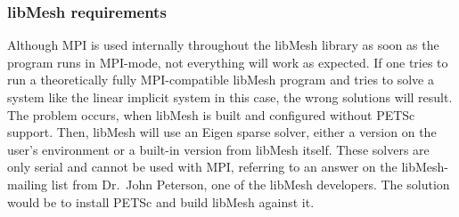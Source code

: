  
  \subsubsection{libMesh requirements}
   Although MPI is used internally throughout the libMesh library as soon as the program runs in MPI-mode, not everything will work as expected. If one tries to run a theoretically fully MPI-compatible libMesh program and tries to solve a system like the linear implicit system in this case, the wrong solutions will result. The problem occurs, when libMesh is built and configured without PETSc support. Then, libMesh will use an Eigen sparse solver, either a version on the user's environment or a built-in version from libMesh itself. These solvers are only serial and cannot be used with MPI, referring to an answer on the libMesh-mailing list from Dr.\ John Peterson, one of the libMesh developers. The solution would be to install PETSc and build libMesh against it.
  
 
 
 
